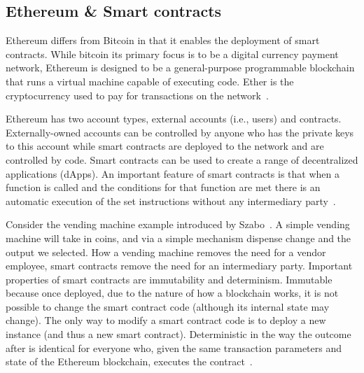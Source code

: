 \documentclass[10pt,conference]{IEEEtran}
\begin{document}
\subsection{Ethereum \& Smart contracts}

Ethereum differs from Bitcoin in that it enables the deployment of smart contracts. %
While bitcoin its primary focus is to be a digital currency payment network, Ethereum is designed to be a general-purpose programmable blockchain that runs a virtual machine capable of executing code.
Ether is the cryptocurrency used to pay for transactions on the network~\cite{mastering}.%

Ethereum has two account types,  external accounts (i.e., users) and contracts. Externally-owned accounts can be controlled by anyone who has the private keys to this account while smart contracts are deployed to the network and are controlled by code.
Smart contracts can be used to create a range of decentralized applications (dApps).  An important feature of smart contracts is that when a function is called and the conditions for that function are met there is an automatic execution of the set instructions without any intermediary party~\cite{ethereum, white_paper}.

Consider the vending machine example introduced by Szabo~\cite{nick}. A simple vending machine will take in coins, and via a simple mechanism dispense change and the output we selected. How a vending machine removes the need for a vendor employee, smart contracts remove the need for an intermediary party. Important properties of smart contracts are immutability and determinism. Immutable because once deployed, due to the nature of how a blockchain works, it is not possible to change the smart contract code (although its internal state may change). The only way to modify a smart contract code is to deploy a new instance (and thus a new smart contract). Deterministic in the way the outcome after is identical for everyone who, given the same transaction parameters and state of the Ethereum blockchain, executes the contract~\cite{white_paper}.
\end{document}
